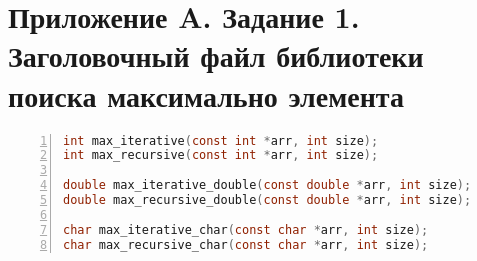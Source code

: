 \section*{Приложение A. Задание 1. Заголовочный файл библиотеки поиска максимально элемента}

\begin{lstlisting}[language=C,numbers=left]
int max_iterative(const int *arr, int size);
int max_recursive(const int *arr, int size);

double max_iterative_double(const double *arr, int size);
double max_recursive_double(const double *arr, int size);

char max_iterative_char(const char *arr, int size);
char max_recursive_char(const char *arr, int size);
\end{lstlisting}